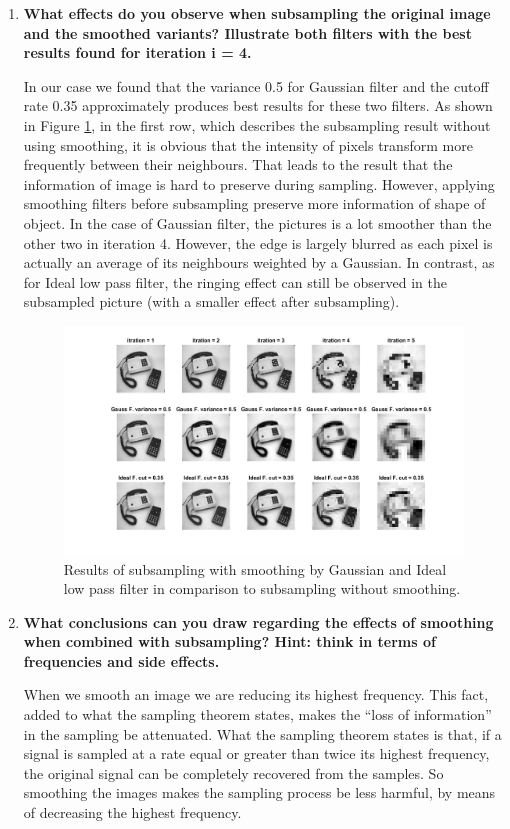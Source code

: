 \documentclass{article}
\begin{document}
\begin{enumerate}
\item \textbf{What effects do you observe when subsampling the original image and the smoothed variants? Illustrate both filters with the best results found for iteration i = 4.}

\par
In our case we found that the variance 0.5 for Gaussian filter and the cutoff rate 0.35 approximately produces best results for these two filters. As shown in Figure \ref{fig3_2}, in the first row, which describes the subsampling result without using smoothing, it is obvious that the intensity of pixels transform more frequently between their neighbours. That leads to the result that the information of image is hard to preserve during sampling. However, applying smoothing filters before subsampling preserve more information of shape of object. %
In the case of Gaussian filter, the pictures is a lot smoother than the other two in iteration 4. However, the edge is largely blurred as each pixel is actually an average of its neighbours weighted by a Gaussian. 
In contrast, as for Ideal low pass filter, the ringing effect can still be observed in the subsampled picture (with a smaller effect after subsampling).%


\begin{figure}[H]
    \centering
    \includegraphics[width = \linewidth]{Lab1_3-2.png}
    \caption{Results of subsampling with smoothing by Gaussian and Ideal low pass filter in comparison to subsampling without smoothing.}
    \label{fig3_2}
\end{figure}


\item \textbf{What conclusions can you draw regarding the effects of smoothing when combined with subsampling? Hint: think in terms of frequencies and side effects.}

When we smooth an image we are reducing its highest frequency. This fact, added to what the sampling theorem states, makes the ``loss of information'' in the sampling be attenuated. What the sampling theorem states is that, if a signal is sampled at a rate equal or greater than twice its highest frequency, the original signal can be completely recovered from the samples. So smoothing the images makes the sampling process be less harmful, by means of decreasing the highest frequency.

\end{enumerate}
\end{document}
